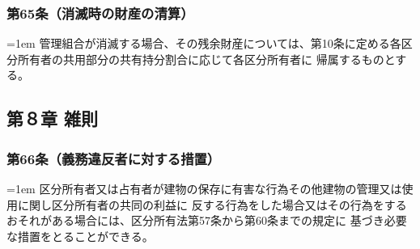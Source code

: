 \documentclass[
  twoside,
  luatex,
  paper=a4paper,
  fontsize=11pt,
  jafontsize=11pt,
  jlreq_notes,
]{jlreq}
\newcommand{\joumain}[1]{%
  \noindent\hangindent=1em\hangafter=1
  \hspace{1em}#1%
}
\begin{document}
  \subsubsection*{第65条（消滅時の財産の清算）}
  \joumain{管理組合が消滅する場合、その残余財産については、第10条に定める各区分所有者の共用部分の共有持分割合に応じて各区分所有者に
  帰属するものとする。}
  
  \begin{center}
  \subsection*{第８章 雑則}
  \end{center}

  \subsubsection*{第66条（義務違反者に対する措置）}
  \joumain{区分所有者又は占有者が建物の保存に有害な行為その他建物の管理又は使用に関し区分所有者の共同の利益に
  反する行為をした場合又はその行為をするおそれがある場合には、区分所有法第57条から第60条までの規定に
  基づき必要な措置をとることができる。}
\end{document}
